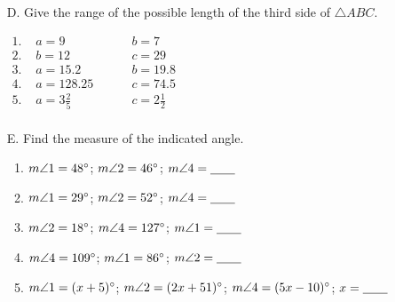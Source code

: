 \def\figdir{/storage/emulated/0/Documents/documents/latex/1920/Grade-8/3rd/inequalities-in-one-triangle/f}


\begin{enumerate}[label = \arabic*. ]
\item[D. ] \hspce Give the range of the possible length of the third side of $\triangle ABC$. 

\vspace*{5ex}\hspace*{17em}
\vspace*{-7ex}

$
\begin{array}{llll}
1. \phantom{i} & a=9 & \phantom{mn} & b=7 \\
2. &	b=12 &	& c=29\\
3. &	a=15.2 &	& b=19.8 \\
4. & a=128.25 & & c=74.5 \\
5. &	a=3 \displaystyle \frac{2}{5} &	& c=2 \displaystyle \frac{1}{2}\\
\end{array}
$

\item[E. ] \hspce Find the measure of the indicated angle. 
\begin{enumerate}[label = \arabic*. ]
\item $m\angle{1} = 48\degree$; $m\angle{2} = 46\degree$; $ m\angle{4} = \underline{\hspace{2em}}$
\item $m\angle{1} = 29\degree$; $ m\angle{2} = 52\degree$; $ m\angle{4} = \underline{\hspace{2em}}$
\item $m\angle{2} = 18\degree$; $ m\angle{4} = 127\degree$; $ m\angle{1} = \underline{\hspace{2em}}$
\item $m\angle{4} = 109\degree$; $ m\angle{1} = 86\degree$; $ m\angle{2} = \underline{\hspace{2em}}$
\item $m\angle{1} = (x+5)\degree$; $ m\angle{2} = (2x+51)\degree$; $ m\angle{4} = (5x-10)\degree$; $ x = \underline{\hspace{2em}}$
\end{enumerate}  
\end{enumerate}   


\vspace*{-19ex}\hspace*{22em}
\vspace*{4ex}


